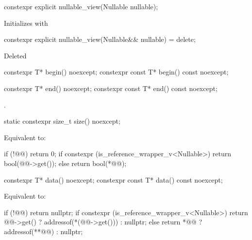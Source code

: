\documentclass[a4paper,10pt,oneside,openany,final,article]{memoir}
\begin{document}
\begin{wording}
\begin{itemdecl}
  constexpr explicit nullable_view(Nullable nullable);
\end{itemdecl}
\begin{itemdescr}
  \pnum{}
  \effects{}
  Initializes  with 
\end{itemdescr}


\begin{itemdecl}
constexpr explicit nullable_view(Nullable&& nullable) = delete;
\end{itemdecl}
\begin{itemdescr}
  \pnum{}
  Deleted
\end{itemdescr}

\begin{itemdecl}
  constexpr T* begin() noexcept;
  constexpr const T* begin() const noexcept;
\end{itemdecl}

\begin{itemdescr}
  \pnum
  \returns
\end{itemdescr}

\begin{itemdecl}
  constexpr T* end() noexcept;
  constexpr const T* end() const noexcept;
\end{itemdecl}

\begin{itemdescr}
  \pnum{}
  \returns
  .
\end{itemdescr}

\begin{itemdecl}
  static constexpr size_t size() noexcept;
\end{itemdecl}

\begin{itemdescr}
  \pnum{}
  \effects{}
  Equivalent to:

  \begin{codeblock}
    if (!@@)
      return 0;
    if constexpr (is_reference_wrapper_v<Nullable>) {
      return bool(@@->get());
    } else {
      return bool(*@@);
    }
  \end{codeblock}
\end{itemdescr}

\begin{itemdecl}
  constexpr T* data() noexcept;
  constexpr const T* data() const noexcept;
\end{itemdecl}

\begin{itemdescr}
\pnum{}
\effects{}
Equivalent to:
\begin{codeblock}
  if (!@@)
    return nullptr;
  if constexpr (is_reference_wrapper_v<Nullable>) {
    return @@->get() ? addressof(*(@@->get())) : nullptr;
  } else {
    return *@@ ? addressof(**@@) : nullptr;
  }
\end{codeblock}
\end{itemdescr}


\end{wording}
\end{document}
